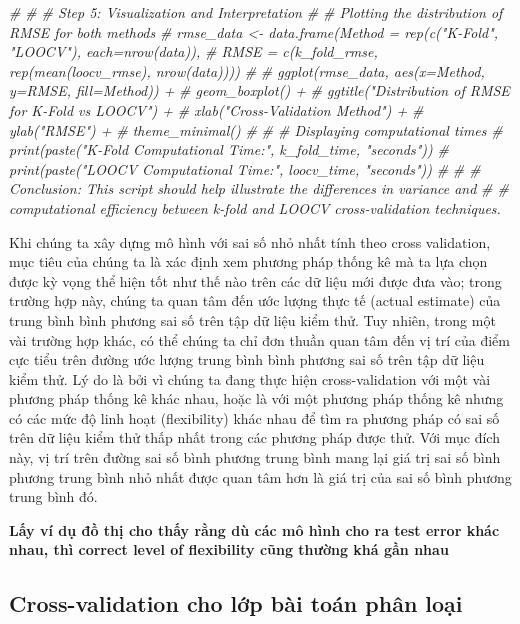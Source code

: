 \documentclass[
]{article}
\newenvironment{Shaded}{\begin{snugshade}}{\end{snugshade}}
\newcommand{\CommentTok}[1]{\textcolor[rgb]{0.56,0.35,0.01}{\textit{#1}}}
\begin{document}
\begin{Shaded}
\begin{Highlighting}[]
\CommentTok{\# }
\CommentTok{\# \# Step 5: Visualization and Interpretation}
\CommentTok{\# \# Plotting the distribution of RMSE for both methods}
\CommentTok{\# rmse\_data \textless{}{-} data.frame(Method = rep(c("K{-}Fold", "LOOCV"), each=nrow(data)),}
\CommentTok{\#                         RMSE = c(k\_fold\_rmse, rep(mean(loocv\_rmse), nrow(data))))}
\CommentTok{\# }
\CommentTok{\# ggplot(rmse\_data, aes(x=Method, y=RMSE, fill=Method)) +}
\CommentTok{\#   geom\_boxplot() +}
\CommentTok{\#   ggtitle("Distribution of RMSE for K{-}Fold vs LOOCV") +}
\CommentTok{\#   xlab("Cross{-}Validation Method") +}
\CommentTok{\#   ylab("RMSE") +}
\CommentTok{\#   theme\_minimal()}
\CommentTok{\# }
\CommentTok{\# \# Displaying computational times}
\CommentTok{\# print(paste("K{-}Fold Computational Time:", k\_fold\_time, "seconds"))}
\CommentTok{\# print(paste("LOOCV Computational Time:", loocv\_time, "seconds"))}
\CommentTok{\# }
\CommentTok{\# \# Conclusion: This script should help illustrate the differences in variance and}
\CommentTok{\# \# computational efficiency between k{-}fold and LOOCV cross{-}validation techniques.}
\end{Highlighting}
\end{Shaded}

Khi chúng ta xây dựng mô hình với sai số nhỏ nhất tính theo cross validation, mục tiêu của chúng ta là xác định xem phương pháp thống kê mà ta lựa chọn được kỳ vọng thể hiện tốt như thế nào trên các dữ liệu mới được đưa vào; trong trường hợp này, chúng ta quan tâm đến ước lượng thực tế (actual estimate) của trung bình bình phương sai số trên tập dữ liệu kiểm thử. Tuy nhiên, trong một vài trường hợp khác, có thể chúng ta chỉ đơn thuần quan tâm đến vị trí của điểm cực tiểu trên đường ước lượng trung bình bình phương sai số trên tập dữ liệu kiểm thử. Lý do là bởi vì chúng ta đang thực hiện cross-validation với một vài phương pháp thống kê khác nhau, hoặc là với một phương pháp thống kê nhưng có các mức độ linh hoạt (flexibility) khác nhau để tìm ra phương pháp có sai số trên dữ liệu kiểm thử thấp nhất trong các phương pháp được thử. Với mục đích này, vị trí trên đường sai số bình phương trung bình mang lại giá trị sai số bình phương trung bình nhỏ nhất được quan tâm hơn là giá trị của sai số bình phương trung bình đó.

\textbf{Lấy ví dụ đồ thị cho thấy rằng dù các mô hình cho ra test error khác nhau, thì correct level of flexibility cũng thường khá gần nhau}

\hypertarget{cross-validation-cho-lux1edbp-buxe0i-touxe1n-phuxe2n-loux1ea1i}{%
\subsection{Cross-validation cho lớp bài toán phân loại}\label{cross-validation-cho-lux1edbp-buxe0i-touxe1n-phuxe2n-loux1ea1i}}
\end{document}
